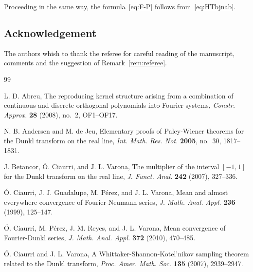 \documentclass[11pt,a4paper]{amsart}
\theoremstyle{plain}
\theoremstyle{definition}
\begin{document}
Proceeding in the same way, the formula~\eqref{eq:F-P} follows from~\eqref{eq:HTbjnab}.

\subsection*{Acknowledgement}
The authors whish to thank the referee for careful reading of the manuscript, 
comments and the suggestion of Remark~\ref{rem:referee}.

\begin{thebibliography}{99}


 L. D. Abreu, {The reproducing kernel structure arising from a
combination of continuous and discrete orthogonal polynomials into Fourier
systems}, \textit{Constr. Approx.} \textbf{28} (2008), no.~2, OF1--OF17.

 N. B. Andersen and M. de Jeu, {Elementary proofs of
Paley-Wiener theorems for the Dunkl transform on the real line},
\textit{Int. Math. Res. Not.} \textbf{2005}, no.~30, 1817--1831.

 J. Betancor, \'O. Ciaurri, and J. L. Varona, {The multiplier
of the interval $[-1,1]$ for the Dunkl transform on the real line,}
\textit{J. Funct. Anal.} \textbf{242} (2007), 327--336.


 \'O. Ciaurri, J. J. Guadalupe, M. P\'erez, and J. L. Varona,
{Mean and almost everywhere convergence of Fourier-Neumann series,}
\textit{J. Math. Anal. Appl.} \textbf{236} (1999), 125--147.

 \'O. Ciaurri, M. P\'erez, J. M. Reyes, and J. L. Varona, 
{Mean convergence of Fourier-Dunkl series,} 
\textit{J. Math. Anal. Appl.} \textbf{372} (2010), 470--485. 

 \'O. Ciaurri and J. L. Varona, {A Whittaker-Shannon-Kotel'nikov
sampling theorem related to the Dunkl transform,} \textit{Proc. Amer. Math.
Soc.} \textbf{135} (2007), 2939--2947.


\end{thebibliography}
\end{document}

